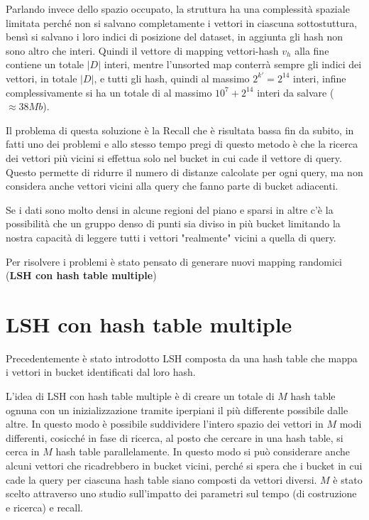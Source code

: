 Parlando invece dello spazio occupato, la struttura ha una complessità spaziale 
limitata perché non si salvano completamente i vettori in ciascuna sottostuttura,
bensì si salvano i loro indici di posizione del dataset, in aggiunta gli hash non 
sono altro che interi. Quindi il vettore di mapping vettori-hash $v_h$ alla fine 
contiene un totale $|D|$ interi, mentre l'unsorted map conterrà sempre gli indici 
dei vettori, in totale $|D|$, e tutti gli hash, quindi al massimo $2^{k'} = 2^ {14}$ 
interi, infine complessivamente si ha un totale di al massimo $10^7 + 2^{14}$ interi 
da salvare ($\approx 38 Mb$).

Il problema di questa soluzione è la Recall che è risultata bassa fin da subito, 
in fatti uno dei problemi e allo stesso tempo pregi di questo metodo è che la ricerca 
dei vettori più vicini si effettua solo nel bucket in cui cade il vettore di query.
Questo permette di ridurre il numero di distanze calcolate per ogni query, ma non 
considera anche vettori vicini alla query che fanno parte di bucket adiacenti.

\begin{esempio}
    Se i dati sono molto densi in alcune regioni del piano e sparsi in altre c'\`e la possibilit\`a
    che un gruppo denso di punti sia diviso in pi\`u bucket limitando la nostra capacit\`a di leggere tutti
    i vettori "realmente" vicini a quella di query.
\end{esempio}

Per risolvere i problemi è stato pensato di generare nuovi mapping randomici (\textbf{LSH con hash table multiple})

\section{LSH con hash table multiple}

Precedentemente è stato introdotto LSH composta da una hash table che mappa i vettori 
in bucket identificati dal loro hash.

L'idea di LSH con hash table multiple è di creare un totale di $M$ hash table ognuna con un
inizializzazione tramite iperpiani il più differente possibile dalle altre. In questo 
modo è possibile suddividere l'intero spazio dei vettori in $M$ modi differenti,
cosicché in fase di ricerca, al posto che cercare in una hash table, si cerca 
in $M$ hash table parallelamente. In questo modo si può considerare anche alcuni vettori che ricadrebbero in bucket vicini,
perché si spera che i bucket in cui cade la query per ciascuna hash table siano composti da vettori diversi.
$M$ è stato scelto attraverso uno studio sull'impatto dei parametri sul tempo (di costruzione e ricerca) e recall.

